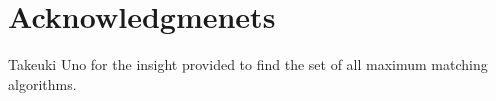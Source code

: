 \documentclass{article}
\begin{document}
\section{Acknowledgmenets}

Takeuki Uno for the insight provided to find the set of all maximum matching algorithms.
\end{document}
